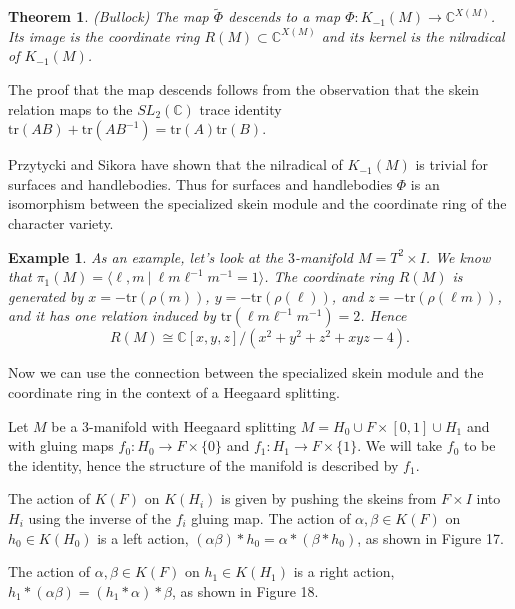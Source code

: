 \documentclass{slides}
\newcommand{\bbc}{\mathbb{C}}
\newtheorem{theorem}{Theorem}
\newtheorem{example}{Example}
\begin{document}
\begin{slide}
\begin{theorem}(Bullock)
The map $\tilde{\Phi}$ descends to a map
$\Phi : K_{-1}(M) \to \mathbb{C}^{X(M)}$.  Its
image is the coordinate ring $R(M) \subset \mathbb{C}^{X(M)}$
and its kernel is the nilradical of $K_{-1}(M)$.
\label{bullock}
\end{theorem}

The proof that the map descends follows from the observation that
the skein relation maps to the $SL_2(\mathbb{C})$ trace identity
$\mathrm{tr}(AB) + \mathrm{tr}(AB^{-1}) = \mathrm{tr}(A)\mathrm{tr}(B)$.

Przytycki and Sikora have shown that
the nilradical of $K_{-1}(M)$ is trivial for surfaces and handlebodies.
Thus for surfaces and handlebodies $\Phi$ is an isomorphism between the specialized
skein module and the coordinate ring of the character variety.
\end{slide}

\begin{slide}
\begin{example}
As an example, let's look at the $3$-manifold $M = T^2 \times I$.  We
know that 
$\pi_1(M) = \langle \ell, m~|~\ell m \ell^{-1} m^{-1} = 1 \rangle$.
The coordinate ring $R(M)$ is generated by
$x = -\mathrm{tr}(\rho(m))$, $y = - \mathrm{tr}(\rho(\ell))$,
and $z = -\mathrm{tr}(\rho(\ell m))$, and it has one
relation induced by $\mathrm{tr}(\ell m \ell^{-1} m^{-1}) = 2$.
Hence
\[
R(M) \cong \bbc[x,y,z] / (x^2 + y^2 + z^2 + xyz - 4).
\]
\label{ex-torus}
\end{example}
\end{slide}

\begin{slide}
Now we can use the connection between the specialized skein
module and the coordinate ring in the context of a Heegaard
splitting.

Let $M$ be a 3-manifold with Heegaard
splitting $M = H_0 \cup F \times [0,1] \cup H_1$
and with gluing maps $f_0 : H_0 \to F \times \{0\}$ and
$f_1: H_1 \to F \times \{1\}$.
We will take $f_0$ to be the identity, hence the structure of the manifold
is described by $f_1$.

The action of $K(F)$ on $K(H_i)$ is
given by pushing the skeins from $F \times I$ into $H_i$ using the inverse of
the $f_i$ gluing map.
The action of $\alpha, \beta \in K(F)$ on $h_0 \in K(H_0)$ is a left action,
$(\alpha \beta) * h_0 = \alpha * (\beta * h_0)$,
as shown in Figure 17.

The action of $\alpha, \beta \in K(F)$ on $h_1 \in K(H_1)$ is a right action,
$h_1 * (\alpha \beta) = (h_1 * \alpha) * \beta$, as shown in Figure 18.
\end{slide}
\end{document}
